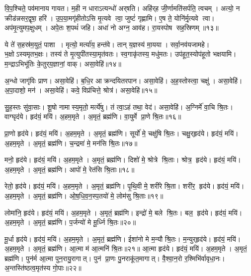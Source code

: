    वि॒प॒श्चिते॒ पव॑मानाय गायत।
   म॒ही न धाराऽत्यन्धो॑ अर्{‌}षति।
   अहि॑र्{‌}ह जी॒र्णामति॑सर्पति॒ त्वचम्।
   अत्यो॒ न क्रीड॑न्नसर॒द्वृषा॒ हरि॑।
   उ॒प॒या॒मगृ॑हीतोऽसि मृ॒त्यवे त्वा॒ जुष्टं॑ गृह्णामि।
   ए॒ष ते॒ योनि॑र्मृ॒त्यवे त्वा।
   अप॑मृ॒त्युमप॒क्षुधम्।
   अपे॒तः श॒पथं॑ जहि।
   अधा॑ नो अग्न॒ आव॑ह।
   रा॒यस्पोष सह॒स्रिणम्॥१३॥

   ये ते॑ स॒हस्र॑म॒युतं॒ पाशा।
   मृत्यो॒ मर्त्या॑य॒ हन्त॑वे।
   तान् य॒ज्ञस्य॑ मा॒यया।
   सर्वा॒नव॑यजामहे।
   भ॒क्षोऽस्यमृतभ॒क्षः।
   तस्य॑ ते मृ॒त्युपी॑तस्या॒मृत॑वतः।
   स्व॒गाकृ॑तस्य॒ मधु॑मतः।
   उप॑हूत॒स्योप॑हूतो भक्षयामि।
   म॒न्द्राऽभिभू॑तिः के॒तुर्{‌}य॒ज्ञानां॒ वाक्।
   असा॒वेहि॑॥१४॥

   अ॒न्धो जागृ॑विः प्राण।
   असा॒वेहि॑।
   ब॒धि॒र आक्रन्दयितरपान।
   असा॒वेहि॑।
   अ॒ह॒स्तोस्त्वा॒ चक्षु॑।
   असा॒वेहि॑।
   अ॒पा॒दाशो॒ मन॑।
   असा॒वेहि॑।
   कवे॒ विप्र॑चित्ते॒ श्रोत्र॑।
   असा॒वेहि॑॥१५॥

   सु॒ह॒स्तः सु॑वा॒साः।
   शू॒षो नामास्य॒मृतो॒ मर्त्ये॑षु।
   तं त्वा॒ऽहं तथा॒ वेद॑।
   असा॒वेहि॑।
   अ॒ग्निर्मे॑ वा॒चि श्रि॒तः।
   वाग्घृद॑ये।
   हृद॑यं॒ मयि॑।
   अ॒हम॒मृते।
   अ॒मृतं॒ ब्रह्म॑णि।
   वा॒युर्मे प्रा॒णे श्रि॒तः॥१६॥

   प्रा॒णो हृद॑ये।
   हृद॑यं॒ मयि॑।
   अ॒हम॒मृते।
   अ॒मृतं॒ ब्रह्म॑णि।
   सूर्यो॑ मे॒ चक्षु॑षि श्रि॒तः।
   चक्षु॒र्{‌}हृद॑ये।
   हृद॑यं॒ मयि॑।
   अ॒हम॒मृते।
   अ॒मृतं॒ ब्रह्म॑णि।
   च॒न्द्रमा॑ मे॒ मन॑सि श्रि॒तः॥१७॥

   मनो॒ हृद॑ये।
   हृद॑यं॒ मयि॑।
   अ॒हम॒मृते।
   अ॒मृतं॒ ब्रह्म॑णि।
   दिशो॑ मे॒ श्रोत्रे श्रि॒ताः।
   श्रोत्र॒ हृद॑ये।
   हृद॑यं॒ मयि॑।
   अ॒हम॒मृते।
   अ॒मृतं॒ ब्रह्म॑णि।
   आपो॑ मे॒ रेत॑सि श्रि॒ताः॥१८॥

   रेतो॒ हृद॑ये।
   हृद॑यं॒ मयि॑।
   अ॒हम॒मृते।
   अ॒मृतं॒ ब्रह्म॑णि।
   पृ॒थि॒वी मे॒ शरी॑रे श्रि॒ता।
   शरी॑र॒ हृद॑ये।
   हृद॑यं॒ मयि॑।
   अ॒हम॒मृते।
   अ॒मृतं॒ ब्रह्म॑णि।
   ओ॒ष॒धि॒व॒न॒स्प॒तयो॑ मे॒ लोम॑सु श्रि॒ताः॥१९॥

   लोमा॑नि॒ हृद॑ये।
   हृद॑यं॒ मयि॑।
   अ॒हम॒मृते।
   अ॒मृतं॒ ब्रह्म॑णि।
   इन्द्रो॑ मे॒ बले श्रि॒तः।
   बल॒ हृद॑ये।
   हृद॑यं॒ मयि॑।
   अ॒हम॒मृते।
   अ॒मृतं॒ ब्रह्म॑णि।
   प॒र्जन्यो॑ मे मू॒र्ध्नि श्रि॒तः॥२०॥

   मू॒र्धा हृद॑ये।
   हृद॑यं॒ मयि॑।
   अ॒हम॒मृते।
   अ॒मृतं॒ ब्रह्म॑णि।
   ईशा॑नो मे म॒न्यौ श्रि॒तः।
   म॒न्युर्{‌}हृद॑ये।
   हृद॑यं॒ मयि॑।
   अ॒हम॒मृते।
   अ॒मृतं॒ ब्रह्म॑णि।
   आ॒त्मा म॑ आ॒त्मनि॑ श्रि॒तः॥२१॥
   आ॒त्मा हृद॑ये।
   हृद॑यं॒ मयि॑।
   अ॒हम॒मृते।
   अ॒मृतं॒ ब्रह्म॑णि।
   पुन॑र्म आ॒त्मा पुन॒रायु॒रागात्।
   पुन॑ प्रा॒णः पु॒नराकू॑त॒मागात्।
   वै॒श्वा॒न॒रो र॒श्मिभि॑र्वावृधा॒नः।
   अ॒न्तस्ति॑ष्ठत्व॒मृत॑स्य गो॒पाः॥२२॥
\anuvakamend

